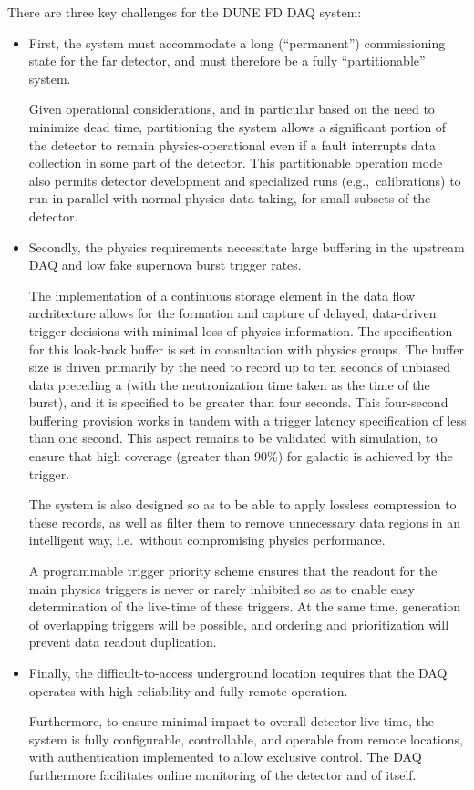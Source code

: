 There are three key challenges for the DUNE FD DAQ system: 
\begin{itemize}
\item First, the system must accommodate a long (``permanent'') commissioning
  state for the far detector, and must therefore be a fully ``partitionable''
  system. 

  Given operational considerations, and in particular based on the need to
  minimize  dead time, partitioning the  system allows a
  significant portion of the detector to remain physics-operational even if a
  fault interrupts data collection in some part of the detector. 
  This partitionable operation mode also permits detector development and
  specialized runs (e.g.,~calibrations) to run in parallel with normal physics
  data taking, for small subsets of the detector.

\item Secondly, the  physics requirements necessitate large buffering
  in the upstream DAQ and low fake supernova burst trigger rates. 

  The implementation of a continuous storage element in the data flow
  architecture allows for the formation and capture of delayed, data-driven
  trigger decisions with minimal loss of physics information.
  The specification for this look-back buffer is set in consultation with
  physics groups.
  The buffer size is driven primarily by the need to record up to ten seconds of
  unbiased data preceding a  (with the neutronization time taken as
  the time of the burst), and it is specified to be greater than four seconds.
  This four-second buffering provision works in tandem with a trigger latency
  specification of less than one second.
  This aspect remains to be validated with simulation, to ensure that high
  coverage (greater than 90\%) for galactic  is achieved by the
   trigger.

  The  system is also designed so as to be able to apply lossless
  compression to these records, as well as filter them to remove unnecessary
  data regions in an intelligent way, i.e.~without compromising physics
  performance.

  A programmable trigger priority scheme ensures that the readout for the main
  physics triggers is never or rarely inhibited so as to enable easy
  determination of the live-time of these triggers. 
  At the same time, generation of overlapping triggers will be possible, and
  ordering and prioritization will prevent data readout duplication. 

\item Finally, the difficult-to-access underground location requires that the
  DAQ operates with high reliability and fully remote operation.

  Furthermore, to ensure minimal impact to overall detector live-time, the
   system is fully configurable, controllable, and operable from
  remote locations, with authentication implemented to allow exclusive control.
  The DAQ furthermore facilitates online monitoring of the detector and of
  itself.

\end{itemize}

